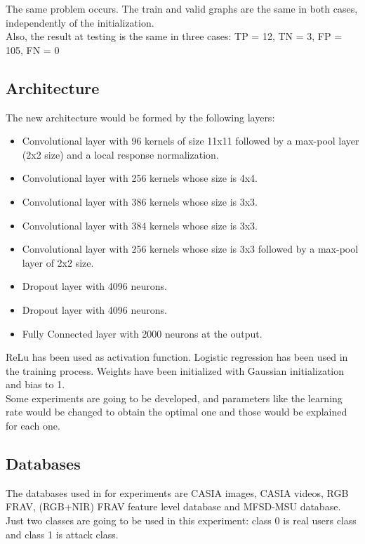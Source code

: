 The same problem occurs. The train and valid graphs are the same in both cases, independently of the initialization.\\ Also, the result at testing is the same in three cases: TP = 12, TN = 3, FP = 105, FN = 0\\

\clearpage
\subsection{Architecture}
The new architecture would be formed by the following layers:
\begin{itemize}[noitemsep,topsep=8pt,parsep=0pt,partopsep=20pt]
\item Convolutional layer with 96 kernels of size 11x11 followed by a max-pool layer (2x2 size) and a local response normalization.
\item Convolutional layer with 256 kernels whose size is 4x4.
\item Convolutional layer with 386 kernels whose size is 3x3.
\item Convolutional layer with 384 kernels whose size is 3x3.
\item Convolutional layer with 256 kernels whose size is 3x3 followed by a max-pool layer of 2x2 size.
\item Dropout layer with 4096 neurons.
\item Dropout layer with 4096 neurons.
\item Fully Connected layer with 2000 neurons at the output.
\end{itemize}

ReLu has been used as activation function. Logistic regression has been used in the training process. Weights have been initialized with Gaussian initialization and bias to 1.\\

Some experiments are going to be developed, and parameters like the learning rate would be changed to obtain the optimal one and those would be explained for each one.\\

\subsection{Databases}
The databases used in for experiments are CASIA images, CASIA videos, RGB FRAV, (RGB+NIR) FRAV feature level database and MFSD-MSU database. Just two classes are going to be used in this experiment: class 0 is real users class and class 1 is attack class.\\

